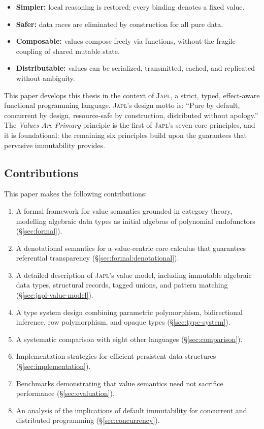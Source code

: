 \documentclass[11pt]{article}
\theoremstyle{definition}
\theoremstyle{remark}
\newcommand{\japl}{\textsc{Japl}}
\begin{document}
\begin{itemize}
  \item \textbf{Simpler:} local reasoning is restored; every binding
    denotes a fixed value.
  \item \textbf{Safer:} data races are eliminated by construction for
    all pure data.
  \item \textbf{Composable:} values compose freely via functions,
    without the fragile coupling of shared mutable state.
  \item \textbf{Distributable:} values can be serialized, transmitted,
    cached, and replicated without ambiguity.
\end{itemize}

This paper develops this thesis in the context of \japl{}, a strict,
typed, effect-aware functional programming language.  \japl{}'s
design motto is: ``Pure by default, concurrent by design,
resource-safe by construction, distributed without apology.''  The
\emph{Values Are Primary} principle is the first of \japl{}'s seven
core principles, and it is foundational: the remaining six principles
build upon the guarantees that pervasive immutability provides.

\subsection{Contributions}

This paper makes the following contributions:

\begin{enumerate}
  \item A formal framework for value semantics grounded in category
    theory, modelling algebraic data types as initial algebras of
    polynomial endofunctors (\S\ref{sec:formal}).
  \item A denotational semantics for a value-centric core calculus
    that guarantees referential transparency
    (\S\ref{sec:formal:denotational}).
  \item A detailed description of \japl{}'s value model, including
    immutable algebraic data types, structural records, tagged unions,
    and pattern matching (\S\ref{sec:japl-value-model}).
  \item A type system design combining parametric polymorphism,
    bidirectional inference, row polymorphism, and opaque types
    (\S\ref{sec:type-system}).
  \item A systematic comparison with eight other languages
    (\S\ref{sec:comparison}).
  \item Implementation strategies for efficient persistent data
    structures (\S\ref{sec:implementation}).
  \item Benchmarks demonstrating that value semantics need not
    sacrifice performance (\S\ref{sec:evaluation}).
  \item An analysis of the implications of default immutability for
    concurrent and distributed programming
    (\S\ref{sec:concurrency}).
\end{enumerate}
\end{document}
